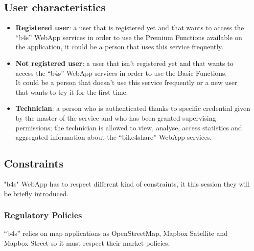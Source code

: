 \documentclass{article}
\begin{document}
\subsection{User characteristics}
\begin{itemize}
    \item \textbf{Registered user}: a user that is registered yet and that wants to access the “b4s” WebApp services in order to use the Premium Functions available on the application, it could be a person that uses this service frequently. 
    \item \textbf{Not registered user}: a user that isn’t registered yet and that wants to access the “b4s” WebApp  services in order to use the Basic Functions.\\ It could be a person that  doesn’t use this service frequently or a new user that wants to try it for the first time.
    \item \textbf{Technician}: a person who is authenticated thanks to specific credential given by the master of the service and  who has been granted supervising permissions; the technician is allowed to view, analyse, access statistics and aggregated information about the “bike4share” WebApp services.
\end{itemize}

\subsection{Constraints}
"b4s" WebApp has to respect different kind of constraints, it this session they will be briefly introduced.
\subsubsection{Regulatory Policies}
“b4s” relies on map applications as OpenStreetMap, Mapbox Satellite and Mapbox Street so it must respect their market policies.
\end{document}
